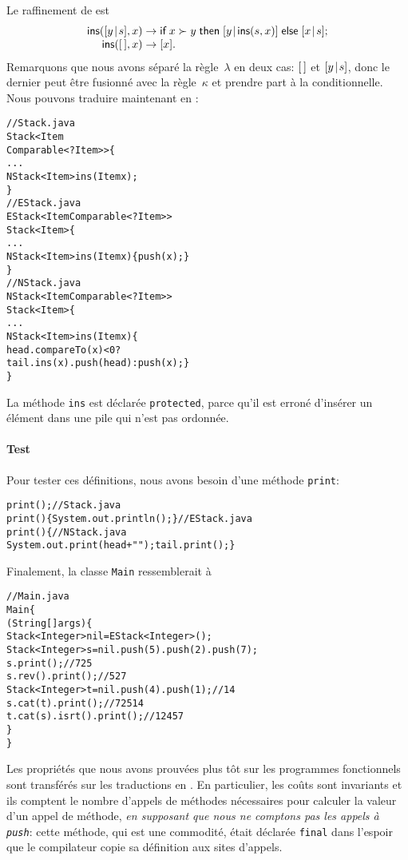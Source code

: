 Le raffinement de  est
\begin{equation*}
\begin{array}{@{}r@{\;}l@{\;}l@{}}
\fun{ins}(\cons{y}{s},x) & \rightarrow & \fun{if} \; x \succ y \;
\fun{then} \; \cons{y}{\fun{ins}(s,x)} \; \fun{else} \; \cons{x}{s};\\
\fun{ins}(\el,x) & \rightarrow & [x].
\end{array}
\end{equation*}
Remarquons que nous avons séparé la règle~\(\lambda\) en deux cas:
\([\,]\) et \([{y}\!\mid\!{s}]\), donc le dernier peut être fusionné avec la
règle~\(\kappa\) et prendre part à la conditionnelle. Nous pouvons
traduire maintenant en \Java:
\begin{alltt}
// Stack.java
\public \abstractX \class Stack<Item
\hfill\extends Comparable<? \super Item>> \{
  ...
  \protectedX \abstractX NStack<Item> ins(\final Item x);
\}
// EStack.java
\public \class EStack<Item \extends Comparable<? \super Item>>
       \extends Stack<Item> \{
  ...
  \protectedX NStack<Item> ins(\final Item x) \{\return push(x);\}
\}
// NStack.java
\public \class NStack<Item \extends Comparable<? \super Item>>
       \extends Stack<Item> \{
  ...
  \protectedX NStack<Item> ins(\final Item x) \{
    \return head.compareTo(x) < 0 ?
           tail.ins(x).push(head) : push(x); \}
\}
\end{alltt}
La méthode \texttt{ins} est déclarée \texttt{protected}, parce qu'il
est erroné d'insérer un élément dans une pile qui n'est pas ordonnée.

\paragraph{Test}

Pour tester ces définitions, nous avons besoin d'une méthode
\texttt{print}:
\begin{alltt}
\public \abstractX \void print();\hfill// Stack.java
\public \void print() \{ System.out.println(); \}\hfill// EStack.java
\public \void print() \{\hfill// NStack.java
  System.out.print(head + " "); tail.print(); \}
\end{alltt}
Finalement, la classe \texttt{Main} ressemblerait à
\begin{alltt}
// Main.java
\public \class Main \{
  \public \static \void \main (String[] args) \{
    Stack<Integer> nil = \new EStack<Integer>();
    Stack<Integer> s = nil.push(5).push(2).push(7);
    s.print();\hfill// 7 2 5
    s.rev().print();\hfill// 5 2 7
    Stack<Integer> t = nil.push(4).push(1);\hfill// 1 4
    s.cat(t).print();\hfill// 7 2 5 1 4
    t.cat(s).isrt().print();\hfill// 1 2 4 5 7
  \}
\}
\end{alltt}
Les propriétés que nous avons prouvées plus tôt sur les programmes
fonctionnels sont transférés sur les traductions en \Java. En
particulier, les coûts sont invariants et ils comptent le nombre
d'appels de méthodes nécessaires pour calculer la valeur d'un appel de
méthode, \emph{en supposant que nous ne comptons pas les appels à
  \texttt{push}}: cette méthode, qui est une commodité, était déclarée
\texttt{final} dans l'espoir que le compilateur copie sa définition
aux sites d'appels.

